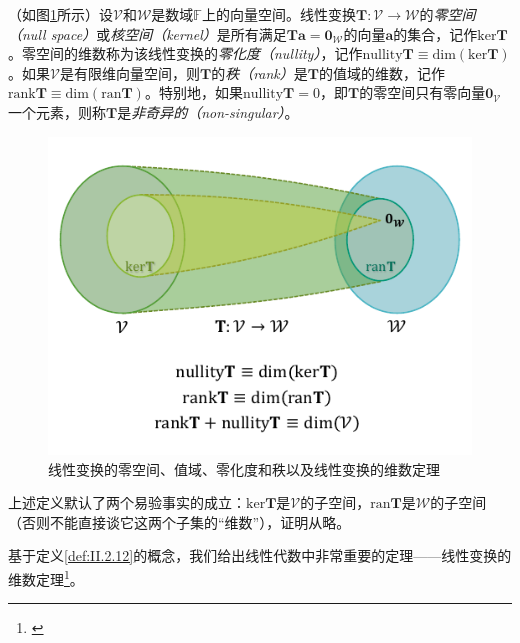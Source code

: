 \documentclass[main.tex]{subfiles}
\begin{document}
\begin{definition}\label{def:II.2.12}
    （如图\ref{fig:II.2.1}所示）设$\mathcal{V}$和$\mathcal{W}$是数域$\mathbb{F}$上的向量空间。线性变换$\mathbf{T}:\mathcal{V}\rightarrow\mathcal{W}$的\emph{零空间（null space）}或\emph{核空间（kernel）}是所有满足$\mathbf{Ta}=\mathbf{0}_\mathcal{W}$的向量$\mathbf{a}$的集合，记作$\mathrm{ker}\mathbf{T}$。零空间的维数称为该线性变换的\emph{零化度（nullity）}，记作$\mathrm{nullity}\mathbf{T}\equiv\mathrm{dim}\left(\mathrm{ker}\mathbf{T}\right)$。如果$\mathcal{V}$是有限维向量空间，则$\mathbf{T}$的\emph{秩（rank）}是$\mathbf{T}$的值域的维数，记作$\mathrm{rank}\mathbf{T}\equiv\mathrm{dim}\left(\mathrm{ran}\mathbf{T}\right)$。特别地，如果$\mathrm{nullity}\mathbf{T}=0$，即$\mathbf{T}$的零空间只有零向量$\mathbf{0}_\mathcal{V}$一个元素，则称$\mathbf{T}$是\emph{非奇异的（non-singular）}。
\end{definition}

\begin{figure}[htbp]
    \centering
    \includegraphics{images/II.2.1.pdf}
    \caption{线性变换的零空间、值域、零化度和秩以及线性变换的维数定理}
    \label{fig:II.2.1}
\end{figure}

上述定义默认了两个易验事实的成立：$\mathrm{ker}\mathbf{T}$是$\mathcal{V}$的子空间，$\mathrm{ran}\mathbf{T}$是$\mathcal{W}$的子空间（否则不能直接谈它这两个子集的“维数”），证明从略\cite[\S7.3“2.线性变换的简单性质(4)”]{周胜林2012线性代数}。

基于定义\ref{def:II.2.12}的概念，我们给出线性代数中非常重要的定理——线性变换的维数定理\footnote{\cite[\S7.3 “2.线性变换的简单性质(5)”]{周胜林2012线性代数}}。
\end{document}
